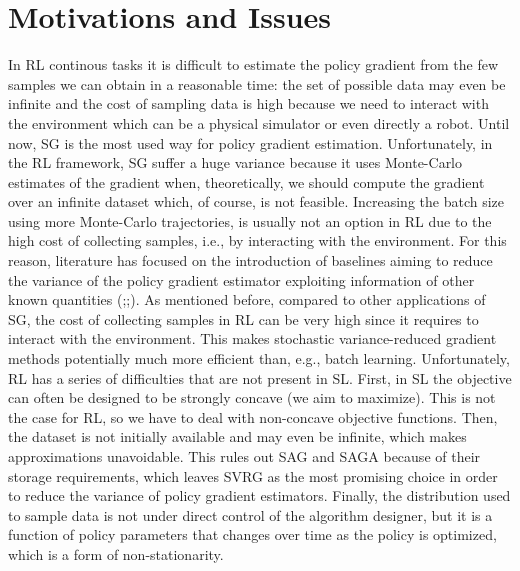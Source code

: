 \section{Motivations and Issues}
In \acs{RL} continous tasks it is difficult to estimate the policy gradient from the few samples we can obtain in a reasonable time: the set of possible data may even be infinite and the cost of sampling data is high because we need to interact with the environment which can be a physical simulator or even directly a robot.
Until now, \acs{SG} is the most used way for policy gradient estimation. Unfortunately, in the \acs{RL} framework, \acs{SG} suffer a huge variance because it uses Monte-Carlo estimates of the gradient when, theoretically, we should compute the gradient over an infinite dataset which, of course, is not feasible. Increasing the batch size \ie using more Monte-Carlo trajectories, is usually not an option in \acs{RL} due to the high cost of collecting samples, i.e., by interacting with the environment. For this reason, literature has focused on the introduction of baselines aiming to reduce the variance of the policy gradient estimator exploiting information of other known quantities (\cite{williams1992simple};\cite{peters2008reinforcement};\cite{thomas2017policy}).\newline 
As mentioned before, compared to other applications of \acs{SG}, the cost of collecting samples in \acs{RL} can be very high since it requires to interact with the environment.
This makes stochastic variance-reduced gradient methods potentially much more efficient than, e.g., batch learning. 
Unfortunately, \acs{RL} has a series of difficulties that are not present in \acs{SL}. First, in \acs{SL} the objective can often be designed to be strongly concave (we aim to maximize). This is not the case for \acs{RL}, so we have to deal with non-concave objective functions. Then, the dataset is not initially available and may even be infinite, which makes approximations unavoidable. This rules out \acs{SAG} and \acs{SAGA} because of their storage requirements, which leaves \acs{SVRG} as the most promising choice in order to reduce the variance of policy gradient estimators.
Finally, the distribution used to sample data is not under direct control of the algorithm designer, but it is a function of policy parameters that changes over time as the policy is optimized, which is a form of non-stationarity.
